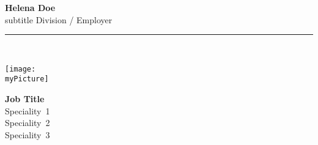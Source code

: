 \documentclass[11pt,a4paper]{memoir}
\newcommand{\myPicture}{%
avatars-material-woman-4%
}
\newcommand{\myName}{%
Helena Doe%
}
\begin{document}
    \begin{Spacing}{1}%
    \noindent
    \textbf{\myName}\\
    \tiny{subtitle}%
    \hfill {\color{gray}
    {%
    \tiny{Division / Employer}%
    }%
    }\\ 
    \rule{\textwidth}{.3mm}\\
    \begin{minipage}[t]{33mm}
        \vspace{-0mm}%
        \texttt{[image: \\myPicture]}
    \end{minipage}
    \hspace{1mm}
    \begin{minipage}[t]{42mm}
        \vspace{-0mm}%
        \begin{flushleft}
        {\scriptsize
            \begin{Spacing}{1}%
            \textbf{Job Title}\\%
            \vspace{1mm}
                \mbox{Speciality 1}\\%
                \mbox{Speciality 2}\\%
                \mbox{Speciality 3}%
            \vspace{1mm}\\
            \end{Spacing}
        }
\newcommand{\websiteItem}{{}\\}
\def \websiteUrl {https://fqdn/}%
\renewcommand{\websiteItem}{%
    {\color{gray}website} & 
    \href{\websiteUrl{}}
    {\websiteUrl{}}\\
}


\end{flushleft}
\end{minipage}
\end{Spacing}
\end{document}
